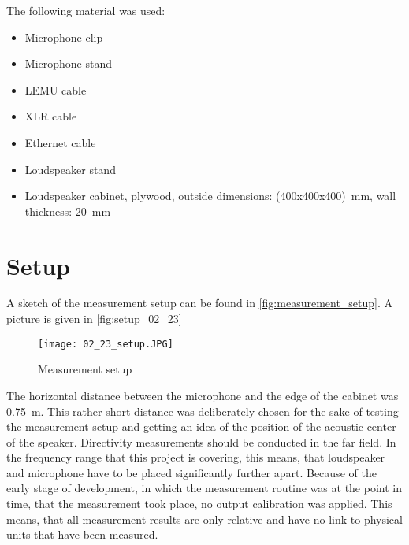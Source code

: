The following material was used:
\begin{itemize}[noitemsep]
\item Microphone clip
\item Microphone stand
\item LEMU cable
\item XLR cable
\item Ethernet cable
\item Loudspeaker stand
\item Loudspeaker cabinet, plywood, outside dimensions: (400x400x400)\SI{}{\milli\meter}, wall thickness: \SI{20}{\milli\meter}
\end{itemize}

\section*{Setup}
A sketch of the measurement setup can be found in \autoref{fig:measurement_setup}. A picture is given in \autoref{fig:setup_02_23}

\begin{figure}[htbp]
	\centering
	\texttt{[image: 02\_23\_setup.JPG]}
	\caption{Measurement setup}
		\label{fig:setup_02_23}
\end{figure}

The horizontal distance between the microphone and the edge of the cabinet was \SI{0.75}{\meter}. This rather short distance was deliberately chosen for the sake of testing the measurement setup and getting an idea of the position of the acoustic center of the speaker. Directivity measurements should be conducted in the far field. In the frequency range that this project is covering, this means, that loudspeaker and microphone have to be placed significantly further apart. Because of the early stage of development, in which the measurement routine was at the point in time, that the measurement took place, no output calibration was applied. This means, that all measurement results are only relative and have no link to physical units that have been measured.

